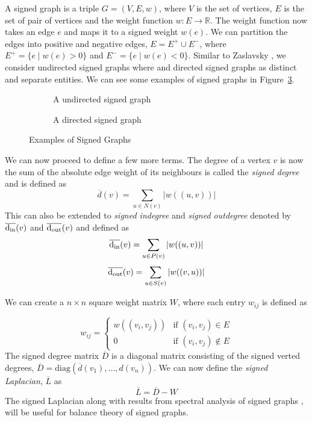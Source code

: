 A signed graph is a triple $G=(V,E,w)$, where $V$ is the set of vertices, $E$ is the set of pair of vertices and the weight function $w:E \rightarrow \mathbb{R}$. The weight function now takes an edge $e$ and maps it to a signed weight $w(e)$. We can partition the edges into positive and negative edges, $E = E^{+}\cup E^{-}$, where $E^{+} = \{e \mid w(e)>0\}$ and $E^{-}=\{e \mid w(e)<0\}$. Similar to Zaslavsky \cite{zaslavsky1982signed}, we consider undirected signed graphs where and directed signed graphs as distinct and separate entities. We can see some examples of signed graphs in Figure~\ref{fig:signed-graphs}.
\begin{figure}[!ht]
    \centering
    \begin{subfigure}{0.5\textwidth}
        \centering
        
        \caption{A undirected signed graph}
        \label{fig:signed-undirected}
    \end{subfigure}

    \begin{subfigure}{0.5\textwidth}
        \centering
        
        \caption{A directed signed graph}
        \label{fig:signed-directed graph}
    \end{subfigure}
    \caption{Examples of Signed Graphs}
    \label{fig:signed-graphs}
\end{figure}

We can now proceed to define a few more terms. The degree of a vertex $v$ is now the sum of the absolute edge weight of its neighbours is called the \textit{signed degree} and is defined as 
\[
    \overline{d}(v) = \sum_{u \in N(v)}|w((u,v))|
\] 
This can also be extended to \textit{signed indegree} and \textit{signed outdegree} denoted by $\overline{\operatorname*{d_{\text{in}}}}(v)$ and $\overline{\operatorname*{d_{\text{out}}}}(v)$ and defined as
\[
    \overline{\operatorname*{d_{\text{in}}}}(v)=\sum_{u \in P(v)}|w((u,v))|
\] 
\[
    \overline{\operatorname*{d_{\text{out}}}}(v)=\sum_{u \in S(v)}|w((v,u))|
\] 

We can create a $n \times n$ square weight matrix $W$, where each entry $w_{ij}$ is defined as 

\[ w_{ij} = 
\begin{cases}
    w((v_i,v_j)) & \text{if } (v_i,v_j) \in E \\
    0 & \text{if } (v_i,v_j) \notin E      
\end{cases}
\] 
The signed degree matrix $\overline{D}$ is a diagonal matrix consisting of the signed verted degrees, $\overline{D} = \text{diag}(\overline{d}(v_{1}),\dots,d(v_n))$. We can now define the \textit{signed Laplacian}, $\overline{L}$ as 
\[ \overline{L} = \overline{D} - W\]
The signed Laplacian along with results from spectral analysis of signed graphs \cite{hou2005bounds,kunegis2010spectral}, will be useful for balance theory of signed graphs. 

